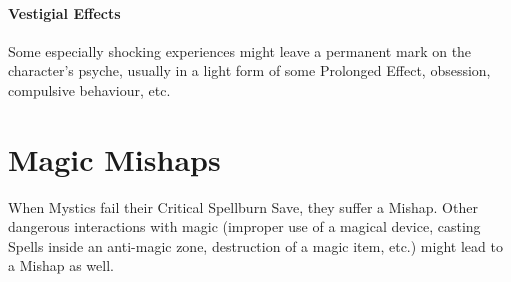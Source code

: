 \documentclass[itdr/core]{subfiles}
\begin{document}
\paragraph{Vestigial Effects}
Some especially shocking experiences might leave a permanent mark on the character's psyche, usually in a light form of some Prolonged Effect, obsession, compulsive behaviour, etc.


\vfill
\break


\section{Magic Mishaps}
\label{sec:magic_mishaps}

When Mystics fail their Critical Spellburn Save, they suffer a Mishap. Other dangerous \mbox{interactions} with magic (improper use of a magical device, casting Spells inside an anti-magic zone, destruction of a magic item, etc.) might lead to a Mishap as well.
\end{document}
